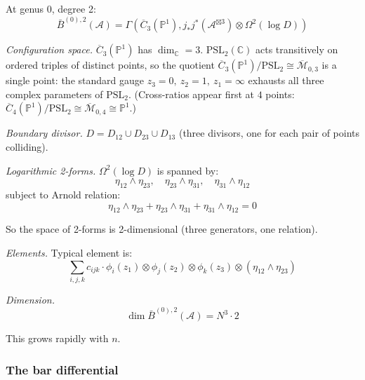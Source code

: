 \begin{example}\label{ex:bar-genus0-deg2}
At genus 0, degree 2:
\[\bar{B}^{(0),2}(\mathcal{A}) = \Gamma\left(\overline{C}_3(\mathbb{P}^1), j_*j^*(\mathcal{A}^{\boxtimes 3}) \otimes \Omega^2(\log D)\right)\]

\emph{Configuration space.} $\overline{C}_3(\mathbb{P}^1)$ has $\dim_\mathbb{C} = 3$. $\text{PSL}_2(\mathbb{C})$ acts transitively on ordered triples of distinct points, so the quotient $\overline{C}_3(\mathbb{P}^1)/\text{PSL}_2 \cong \overline{\mathcal{M}}_{0,3}$ is a single point: the standard gauge $z_3 = 0,\ z_2 = 1,\ z_1 = \infty$ exhausts all three complex parameters of $\text{PSL}_2$. (Cross-ratios appear first at $4$ points: $\overline{C}_4(\mathbb{P}^1)/\text{PSL}_2 \cong \overline{\mathcal{M}}_{0,4} \cong \mathbb{P}^1$.)

\emph{Boundary divisor.} $D = D_{12} \cup D_{23} \cup D_{13}$ (three divisors, one for each pair of points colliding).

\emph{Logarithmic 2-forms.} $\Omega^2(\log D)$ is spanned by:
\[\eta_{12} \wedge \eta_{23}, \quad \eta_{23} \wedge \eta_{31}, \quad \eta_{31} \wedge \eta_{12}\]
subject to Arnold relation:
\[\eta_{12} \wedge \eta_{23} + \eta_{23} \wedge \eta_{31} + \eta_{31} \wedge \eta_{12} = 0\]

So the space of 2-forms is 2-dimensional (three generators, one relation).

\emph{Elements.} Typical element is:
\[\sum_{i,j,k} c_{ijk} \cdot \phi_i(z_1) \otimes \phi_j(z_2) \otimes \phi_k(z_3) \otimes (\eta_{12} \wedge \eta_{23})\]

\emph{Dimension.}
\[\dim \bar{B}^{(0),2}(\mathcal{A}) = N^3 \cdot 2\]

This grows rapidly with $n$.
\end{example}

\subsubsection{The bar differential}

